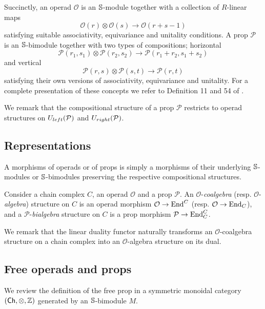Succinctly, an operad $\mathcal O$ is an $\S$-module together with a collection of $R$-linear maps
\begin{equation*}
\mathcal O(r) \otimes \mathcal O(s) \to \mathcal O(r+s-1)
\end{equation*}
satisfying suitable associativity, equivariance and unitality conditions.
A prop $\mathcal P$ is an $\S$-bimodule together with two types of compositions; horizontal
\begin{equation*}
\mathcal P(r_1, s_1) \otimes \mathcal P(r_2, s_2) \to \mathcal P(r_1 + r_2, s_1 + s_2)
\end{equation*}
and vertical
\begin{equation*}
\mathcal P(r,s) \otimes \mathcal P(s, t) \to \mathcal P(r, t)
\end{equation*}
satisfying their own versions of associativity, equivariance and unitality.
For a complete presentation of these concepts we refer to Definition 11 and 54 of \cite{Markl08}.

We remark that the compositional structure of a prop $\mathcal P$ restricts to operad structures on $\Uleft(\mathcal P)$ and $\Uright(\mathcal P)$.

\subsection{Representations}

A morphisms of operads or of props is simply a morphisms of their underlying $\S$-modules or $\S$-bimodules preserving the respective compositional structures.

Consider a chain complex $C$, an operad $\mathcal O$ and a prop $\mathcal P$. An $\mathcal O$-\textit{coalgebra} (resp. $\mathcal O$-\textit{algebra}) structure on $C$ is an operad morphism $\mathcal O \to \End^C$ (resp. $\mathcal O \to \End_C$), and a $\mathcal P$-\textit{bialgebra} structure on $C$ is a prop morphism $\mathcal P \to \End_C^C$.

We remark that the linear duality functor naturally transforms an $\mathcal O$-coalgebra structure on a chain complex into an $\mathcal O$-algebra structure on its dual.

\subsection{Free operads and props}

We review the definition of the free prop in a symmetric monoidal category $(\Ch, \otimes, \Z)$ generated by an $\S$-bimodule $M$.

